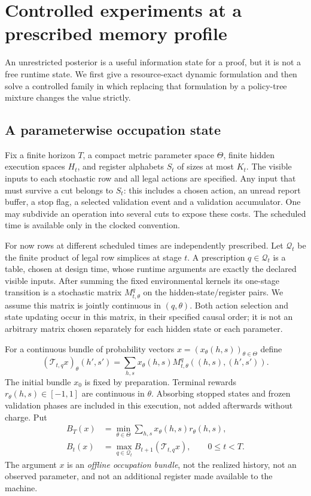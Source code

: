 \section{Controlled experiments at a prescribed memory profile}
\label{sec:controlled-memory}
An unrestricted posterior is a useful information state for a proof, but
it is not a free runtime state. We first give a resource-exact dynamic
formulation and then solve a controlled family in which replacing that
formulation by a policy-tree mixture changes the value strictly.

\subsection{A parameterwise occupation state}
Fix a finite horizon $T$, a compact metric parameter space $\Theta$,
finite hidden execution spaces $H_t$, and register alphabets $S_t$ of
sizes at most $K_t$. The visible inputs to each stochastic row and all
legal actions are specified. Any input that must survive a cut belongs
to $S_t$: this includes a chosen action, an unread report buffer, a stop
flag, a selected validation event and a validation accumulator.
One may subdivide an operation into several cuts to expose these costs.
The scheduled time is available only in the clocked convention.

For now rows at different scheduled times are independently prescribed.
Let $\mathcal Q_t$ be the finite product of legal row simplices at stage
$t$. A prescription $q\in\mathcal Q_t$ is a table, chosen at design
time, whose runtime arguments are exactly the declared visible inputs.
After summing the fixed environmental kernels its one-stage transition
is a stochastic matrix $M^q_{t,\theta}$ on the hidden-state/register
pairs. We assume this matrix is jointly continuous in $(q,\theta)$.
Both action selection and state updating occur in this matrix, in their
specified causal order; it is not an arbitrary matrix chosen separately
for each hidden state or each parameter.

For a continuous bundle of probability vectors
$x=(x_\theta(h,s))_{\theta\in\Theta}$ define
\[
 (\mathcal T_{t,q}x)_\theta(h',s')
  =\sum_{h,s}x_\theta(h,s)
              M^q_{t,\theta}((h,s),(h',s')).
\]
The initial bundle $x_0$ is fixed by preparation. Terminal rewards
$r_\theta(h,s)\in[-1,1]$ are continuous in $\theta$.
Absorbing stopped states and frozen validation phases are included in
this execution, not added afterwards without charge. Put
\begin{align}
 B_T(x)&=\min_{\theta\in\Theta}\sum_{h,s}x_\theta(h,s)r_\theta(h,s),
                                                    \label{eq:memory-terminal}\\
 B_t(x)&=\max_{q\in\mathcal Q_t}B_{t+1}(\mathcal T_{t,q}x),
       \qquad 0\le t<T.                              \label{eq:memory-dp}
\end{align}
The argument $x$ is an \emph{offline occupation bundle}, not the
realized history, not an observed parameter, and not an additional
register made available to the machine.

